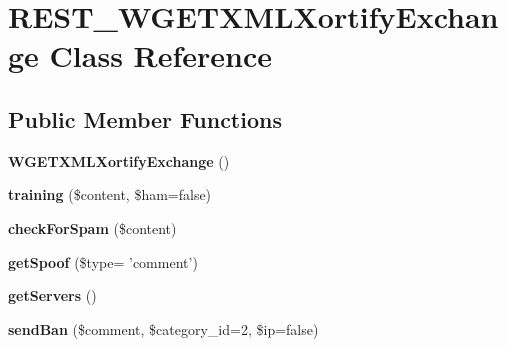 \hypertarget{class_r_e_s_t___w_g_e_t_x_m_l_xortify_exchange}{\section{R\-E\-S\-T\-\_\-\-W\-G\-E\-T\-X\-M\-L\-Xortify\-Exchange Class Reference}
\label{class_r_e_s_t___w_g_e_t_x_m_l_xortify_exchange}
}
\subsection*{Public Member Functions}
\begin{DoxyCompactItemize}
\item 
\hypertarget{class_r_e_s_t___w_g_e_t_x_m_l_xortify_exchange_abadaa189e4e0968649abc2783fb99e16}{{\bfseries W\-G\-E\-T\-X\-M\-L\-Xortify\-Exchange} ()}\label{class_r_e_s_t___w_g_e_t_x_m_l_xortify_exchange_abadaa189e4e0968649abc2783fb99e16}

\item 
\hypertarget{class_r_e_s_t___w_g_e_t_x_m_l_xortify_exchange_a634caf6cb18cad325164079a1fb30549}{{\bfseries training} (\$content, \$ham=false)}\label{class_r_e_s_t___w_g_e_t_x_m_l_xortify_exchange_a634caf6cb18cad325164079a1fb30549}

\item 
\hypertarget{class_r_e_s_t___w_g_e_t_x_m_l_xortify_exchange_a2b5b51a967fec79d13ebc48bd11335fd}{{\bfseries check\-For\-Spam} (\$content)}\label{class_r_e_s_t___w_g_e_t_x_m_l_xortify_exchange_a2b5b51a967fec79d13ebc48bd11335fd}

\item 
\hypertarget{class_r_e_s_t___w_g_e_t_x_m_l_xortify_exchange_a35eadfaf71feccbec34747d72bad3f20}{{\bfseries get\-Spoof} (\$type= 'comment')}\label{class_r_e_s_t___w_g_e_t_x_m_l_xortify_exchange_a35eadfaf71feccbec34747d72bad3f20}

\item 
\hypertarget{class_r_e_s_t___w_g_e_t_x_m_l_xortify_exchange_a75e7e15d0fa51c6c4692b394a0751a25}{{\bfseries get\-Servers} ()}\label{class_r_e_s_t___w_g_e_t_x_m_l_xortify_exchange_a75e7e15d0fa51c6c4692b394a0751a25}

\item 
\hypertarget{class_r_e_s_t___w_g_e_t_x_m_l_xortify_exchange_aebc400325c6f95dd25ec2b7703e2dac7}{{\bfseries send\-Ban} (\$comment, \$category\-\_\-id=2, \$ip=false)}\label{class_r_e_s_t___w_g_e_t_x_m_l_xortify_exchange_aebc400325c6f95dd25ec2b7703e2dac7}


\end{DoxyCompactItemize}
